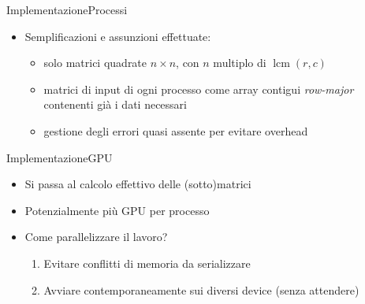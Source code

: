 \documentclass{beamer}
\DeclareMathOperator{\lcm}{lcm}
\begin{document}
\begin{frame}{Implementazione}{Processi}
    \begin{itemize}
        \item Semplificazioni e assunzioni effettuate:
              \begin{itemize}
                  \item solo matrici quadrate $n \times n$, con $n$ multiplo di $\lcm(r,c)$
                  \item matrici di input di ogni processo come array contigui \textit{row-major} contenenti già i dati necessari
                  \item gestione degli errori quasi assente per evitare overhead
              \end{itemize}
    \end{itemize}
\end{frame}

\begin{frame}{Implementazione}{GPU}
    \begin{itemize}
        \item Si passa al calcolo effettivo delle (sotto)matrici
        \item Potenzialmente più GPU per processo
        \item Come parallelizzare il lavoro?
              \begin{enumerate}
                  \item Evitare conflitti di memoria da serializzare
                  \item Avviare contemporaneamente sui diversi device (senza attendere)
              \end{enumerate}
    \end{itemize}
\end{frame}
\end{document}
